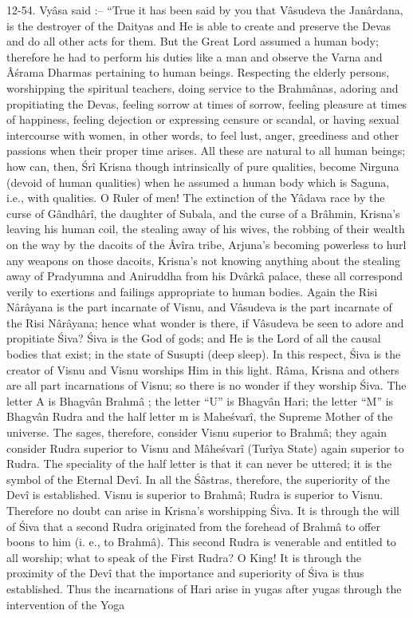 12-54. Vy\^asa said :-- ``True it has been said by you that V\^asudeva the Jan\^ardana, is the destroyer of the Daityas and He is able to create and preserve the Devas and do all other acts for them. But the Great Lord assumed a human body; therefore he had to perform his duties like a man and observe the Varna and \^A\'srama Dharmas pertaining to human beings. Respecting the elderly persons, worshipping the spiritual teachers, doing service to the Brahm\^anas, adoring and propitiating the Devas, feeling sorrow at times of sorrow, feeling pleasure at times of happiness, feeling dejection or expressing censure or scandal, or having sexual intercourse with women, in other words, to feel lust, anger, greediness and other passions when their proper time arises. All these are natural to all human beings; how can, then, \'Sr\^i Krisna though intrinsically of pure qualities, become Nirguna (devoid of human qualities) when he assumed a human body which is Saguna, i.e., with qualities. O Ruler of men! The extinction of the Y\^adava race by the curse of G\^andh\^ar\^i, the daughter of Subala, and the curse of a Br\^ahmin, Krisna's leaving his human coil, the stealing away of his wives, the robbing of their wealth on the way by the dacoits of the \^Av\^ira tribe, Arjuna's becoming powerless to hurl any weapons on those dacoits, Krisna's not knowing anything about the stealing away of Pradyumna and Aniruddha from his Dv\^ark\^a palace, these all correspond verily to exertions and failings appropriate to human bodies. Again the Risi N\^ar\^ayana is the part incarnate of Visnu, and V\^asudeva is the part incarnate of the Risi N\^ar\^ayana; hence what wonder is there, if V\^asudeva be seen to adore and propitiate \'Siva? \'Siva is the God of gods; and He is the Lord of all the causal bodies that exist; in the state of Susupti (deep sleep). In this respect, \'Siva is the creator of Visnu and Visnu worships Him in this light. R\^ama, Krisna and others are all part incarnations of Visnu; so there is no wonder if they worship \'Siva. The letter A is Bhagv\^an Brahm\^a ; the letter ``U'' is Bhagv\^an Hari; the letter ``M'' is Bhagv\^an Rudra and the half letter m is Mahe\'svar\^i, the Supreme Mother of the universe. The sages, therefore, consider Visnu superior to Brahm\^a; they again consider Rudra superior to Visnu and M\^ahe\'svar\^i (Tur\^iya State) again superior to Rudra. The speciality of the half letter is that it can never be uttered; it is the symbol of the Eternal Dev\^i. In all the \'S\^astras, therefore, the superiority of the Dev\^i is established. Visnu is superior to Brahm\^a; Rudra is superior to Visnu. Therefore no doubt can arise in Krisna's worshipping \'Siva. It is through the will of \'Siva that a second Rudra originated from the forehead of Brahm\^a to offer boons to him (i. e., to Brahm\^a). This second Rudra is venerable and entitled to all worship; what to speak of the First Rudra? O King! It is through the proximity of the Dev\^i that the importance and superiority of \'Siva is thus established. Thus the incarnations of Hari arise in yugas after yugas through the intervention of the Yoga

